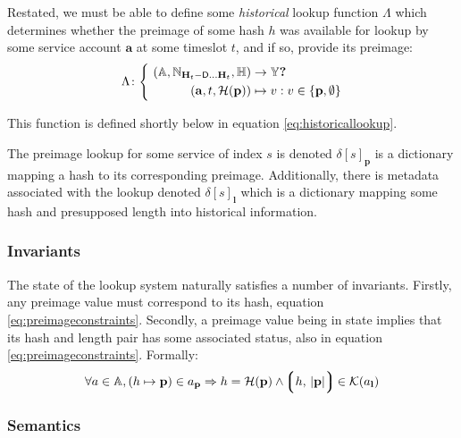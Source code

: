 Restated, we must be able to define some \emph{historical} lookup function $\Lambda$ which determines whether the preimage of some hash $h$ was available for lookup by some service account $\mathbf{a}$ at some timeslot $t$, and if so, provide its preimage:
\begin{equation}
\begin{aligned}
  \Lambda\colon \left\{\ \begin{aligned}
    (\mathbb{A}, \N_{\mathbf{H}_t - \mathsf{D}\dots\mathbf{H}_t}, \mathbb{H}) &\to \mathbb{Y}\bm{?} \\
    (\mathbf{a}, t, \hash(\mathbf{p})) &\mapsto v : v \in \{ \mathbf{p}, \none \}
  \end{aligned}\right.
\end{aligned}
\end{equation}

This function is defined shortly below in equation \ref{eq:historicallookup}.

The preimage lookup for some service of index $s$ is denoted $\delta[s]_\mathbf{p}$ is a dictionary mapping a hash to its corresponding preimage. Additionally, there is metadata associated with the lookup denoted $\delta[s]_\mathbf{l}$ which is a dictionary mapping some hash and presupposed length into historical information.

\subsubsection{Invariants}

The state of the lookup system naturally satisfies a number of invariants. Firstly, any preimage value must correspond to its hash, equation \ref{eq:preimageconstraints}. Secondly, a preimage value being in state implies that its hash and length pair has some associated status, also in equation \ref{eq:preimageconstraints}. Formally:
\begin{equation}\label{eq:preimageconstraints}
  \forall a \in \mathbb{A}, (h \mapsto \mathbf{p}) \in a_\mathbf{p} \Rightarrow
    h = \hash(\mathbf{p})\wedge
    \tup{h \ts |\mathbf{p}|} \in \keys{a_\mathbf{l}}
\end{equation}

\subsubsection{Semantics}

